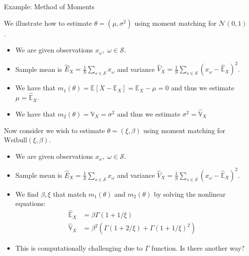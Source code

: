 \documentclass[9pt]{beamer}
\begin{document}
%
\begin{frame}{Example: Method of Moments}

We illustrate how to estimate $\theta=(\mu,\sigma^2)$ using moment matching for $\mathcal{N}(0,1)$.
\begin{itemize}
\item We are given observations $x_\omega,\; \omega \in \mathcal{S}$.
\item Sample mean is $\hat{E}_X=\frac{1}{S}\sum_{s\in\mathcal{S}}x_\omega$ and variance $\hat{V}_X=\frac{1}{S}\sum_{s\in\mathcal{S}}(x_\omega-\hat{\mathbb{E}}_X)^2$. 
\item We have that $m_1(\theta)=\mathbb{E}[X-\mathbb{E}_X]=\mathbb{E}_X-\mu=0$ and thus we estimate $\mu=\hat{\mathbb{E}}_X$.
\item We have that $m_2(\theta)=\mathbb{V}_X=\sigma^2$ and thus we estimate $\sigma^2=\hat{\mathbb{V}}_X$
\end{itemize}
Now consider we wish to estimate $\theta=(\xi,\beta)$ using moment matching for $\textrm{Weibull}(\xi,\beta)$. 
\begin{itemize}
\item We are given observations $x_\omega,\; \omega \in \mathcal{S}$.
\item Sample mean is $\hat{E}_X=\frac{1}{S}\sum_{s\in\mathcal{S}}x_\omega$ and variance $\hat{V}_X=\frac{1}{S}\sum_{s\in\mathcal{S}}(x_\omega-\hat{\mathbb{E}}_X)^2$. 
\item We find $\beta,\xi$ that match $m_1(\theta)$ and $m_2(\theta)$ by solving the nonlinear equations:
\begin{align*}
\hat{\mathbb{E}}_X&=\beta\Gamma(1+1/\xi)\\
\hat{\mathbb{V}}_X&=\beta^2\left(\Gamma(1+2/\xi)+\Gamma(1+1/\xi)^2\right)
\end{align*}
\item This is computationally challenging due to $\Gamma$ function.  Is there another way?
\end{itemize}
\end{frame}
\end{document}
